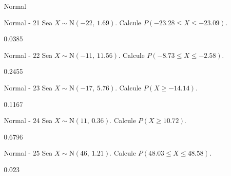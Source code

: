 \documentclass[a4,11pt]{aleph-notas}
\newcommand{\Norm}{\text{N}}
\begin{document}
\begin{quiz}{Normal}
\begin{numerical}[tolerance=0.001]%
    {Normal - 21}
    Sea \( X \sim \Norm(-22,\ 1.69) \). Calcule \( P(-23.28 \leq X \leq -23.09) \).
    \item[] 0.0385
\end{numerical}

\begin{numerical}[tolerance=0.001]%
    {Normal - 22}
    Sea \( X \sim \Norm(-11,\ 11.56) \). Calcule \( P(-8.73 \leq X \leq -2.58) \).
    \item[] 0.2455
\end{numerical}

\begin{numerical}[tolerance=0.001]%
    {Normal - 23}
    Sea \( X \sim \Norm(-17,\ 5.76) \). Calcule \( P(X \geq -14.14) \).
    \item[] 0.1167
\end{numerical}

\begin{numerical}[tolerance=0.001]%
    {Normal - 24}
    Sea \( X \sim \Norm(11,\ 0.36) \). Calcule \( P(X \geq 10.72) \).
    \item[] 0.6796
\end{numerical}

\begin{numerical}[tolerance=0.001]%
    {Normal - 25}
    Sea \( X \sim \Norm(46,\ 1.21) \). Calcule \( P(48.03 \leq X \leq 48.58) \).
    \item[] 0.023
\end{numerical}




\end{quiz}
\end{document}
